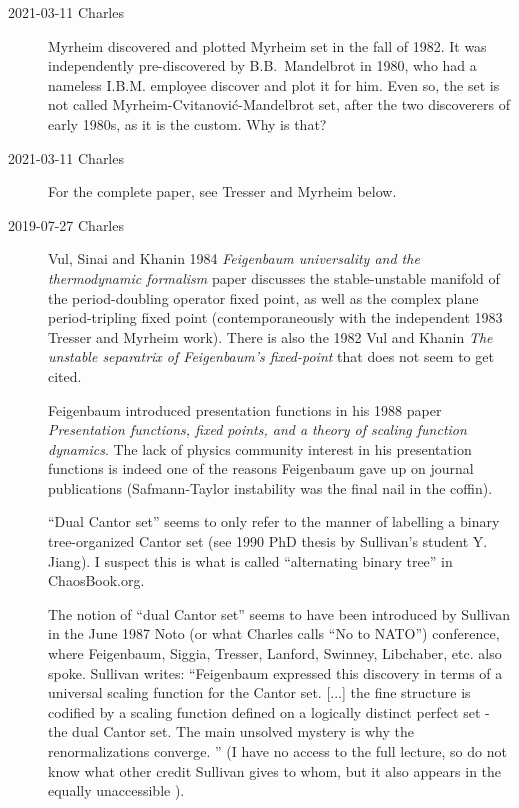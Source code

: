 \begin{description}
  \item[2021-03-11 Charles]
Myrheim discovered and plotted Myrheim set in the fall of 1982.
It was independently pre-discovered by B.B.~Mandelbrot in 1980, who had a
nameless I.B.M. employee discover and plot it for him. Even so, the set
is not called
Myrheim-Cvitanovi\'c-Mandelbrot set, after
the two discoverers of early 1980s, as it is the custom. Why is that?
  \item[2021-03-11 Charles]
For the complete paper, see {Tresser and Myrheim} below.
  \item[2019-07-27 Charles]
Vul, Sinai and Khanin 1984 {\em Feigenbaum universality and
the thermodynamic formalism} paper discusses the stable-unstable manifold
of the period-doubling operator fixed point, as well as the complex plane
period-tripling fixed point (contemporaneously with the independent 1983
Tresser and Myrheim work). There is also the
1982 Vul and Khanin {\em The unstable separatrix of
{Feigenbaum}'s fixed-point} that does not seem to get cited.

Feigenbaum introduced presentation functions in his 1988
paper {\em Presentation functions, fixed points, and a
theory of scaling function dynamics}. The lack of physics community
interest in his presentation functions is indeed one of the reasons
Feigenbaum gave up on journal publications
(Safmann-Taylor instability was the final nail in the
coffin).

``Dual Cantor set'' {seems to only} refer to the manner of labelling a
binary tree-organized Cantor set (see 1990 PhD thesis by Sullivan's
student
{Y. Jiang}). I suspect this is what is called ``alternating  binary
tree'' in
{ChaosBook.org}.

The notion of ``dual Cantor set'' seems to have been introduced by
Sullivan in the June 1987 Noto (or what Charles calls ``No
to NATO'') conference, where Feigenbaum, Siggia,
Tresser, Lanford, Swinney, Libchaber, etc. also spoke. Sullivan
writes: ``Feigenbaum expressed this discovery in terms of a universal
scaling function for the Cantor set. [...] the fine structure is codified
by a scaling function defined on a logically distinct perfect set - the
dual Cantor set. The main unsolved mystery is why the renormalizations
converge. '' (I have no access to the full lecture, so do not know what
other credit Sullivan gives to whom, but it also appears in the equally
unaccessible ).


\end{description}

